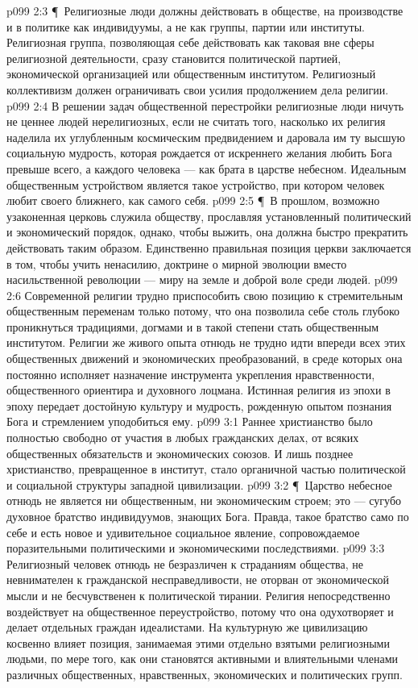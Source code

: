 \vs p099 2:3 \P\ Религиозные люди должны действовать в обществе, на производстве и в политике как индивидуумы, а не как группы, партии или институты. Религиозная группа, позволяющая себе действовать как таковая вне сферы религиозной деятельности, сразу становится политической партией, экономической организацией или общественным институтом. Религиозный коллективизм должен ограничивать свои усилия продолжением дела религии.
\vs p099 2:4 В решении задач общественной перестройки религиозные люди ничуть не ценнее людей нерелигиозных, если не считать того, насколько их религия наделила их углубленным космическим предвидением и даровала им ту высшую социальную мудрость, которая рождается от искреннего желания любить Бога превыше всего, а каждого человека --- как брата в царстве небесном. Идеальным общественным устройством является такое устройство, при котором человек любит своего ближнего, как самого себя.
\vs p099 2:5 \P\ В прошлом, возможно узаконенная церковь служила обществу, прославляя установленный политический и экономический порядок, однако, чтобы выжить, она должна быстро прекратить действовать таким образом. Единственно правильная позиция церкви заключается в том, чтобы учить ненасилию, доктрине о мирной эволюции вместо насильственной революции --- миру на земле и доброй воле среди людей.
\vs p099 2:6 Современной религии трудно приспособить свою позицию к стремительным общественным переменам только потому, что она позволила себе столь глубоко проникнуться традициями, догмами и в такой степени стать общественным институтом. Религии же живого опыта отнюдь не трудно идти впереди всех этих общественных движений и экономических преобразований, в среде которых она постоянно исполняет назначение инструмента укрепления нравственности, общественного ориентира и духовного лоцмана. Истинная религия из эпохи в эпоху передает достойную культуру и мудрость, рожденную опытом познания Бога и стремлением уподобиться ему.
\vs p099 3:1 Раннее христианство было полностью свободно от участия в любых гражданских делах, от всяких общественных обязательств и экономических союзов. И лишь позднее христианство, превращенное в институт, стало органичной частью политической и социальной структуры западной цивилизации.
\vs p099 3:2 \P\ Царство небесное отнюдь не является ни общественным, ни экономическим строем; это --- сугубо духовное братство индивидуумов, знающих Бога. Правда, такое братство само по себе и есть новое и удивительное социальное явление, сопровождаемое поразительными политическими и экономическими последствиями.
\vs p099 3:3 Религиозный человек отнюдь не безразличен к страданиям общества, не невнимателен к гражданской несправедливости, не оторван от экономической мысли и не бесчувственен к политической тирании. Религия непосредственно воздействует на общественное переустройство, потому что она одухотворяет и делает отдельных граждан идеалистами. На культурную же цивилизацию косвенно влияет позиция, занимаемая этими отдельно взятыми религиозными людьми, по мере того, как они становятся активными и влиятельными членами различных общественных, нравственных, экономических и политических групп.
